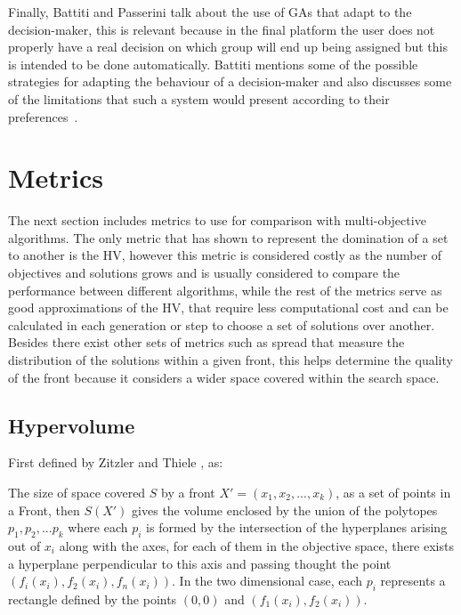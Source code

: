 Finally, Battiti and Passerini \cite{Battiti2010-xo} talk about the use of GAs that adapt to the decision-maker, this is relevant because in the final platform the user does not properly have a real decision on which group will end up being assigned but this is intended to be done automatically. Battiti mentions some of the possible strategies for adapting the behaviour of a decision-maker and also discusses some of the limitations that such a system would present according to their preferences~\cite{Wang2010-zh}.\\

\section{Metrics}

The next section includes metrics to use for comparison with multi-objective algorithms. The only metric that has shown to represent the domination of a set to another is the HV, however this metric is considered costly as the number of objectives and solutions grows and is usually considered to compare the performance between different algorithms, while the rest of the metrics serve as good approximations of the HV, that require less computational cost and can be calculated in each generation or step to choose a set of solutions over another. Besides there exist other sets of metrics such as spread that measure the distribution of the solutions within a given front, this helps determine the quality of the front because it considers a wider space covered within the search space.\\

\subsection{Hypervolume}

First defined by Zitzler and Thiele \cite{zitzler1999multiobjective}, as:

\begin{definition}
The size of space covered $S$ by a front $X' = (x_1, x_2,...,x_k)$, as a set of points in a Front, then $S(X')$ gives the volume enclosed by the union of the polytopes $p_1, p_2,... p_k$ where each $p_i$ is formed by the intersection of the hyperplanes arising out of ${x_i}$ along with the axes, for each of them in the objective space, there exists a hyperplane perpendicular to this axis and passing thought the point $(f_i(x_i), f_2(x_i), f_n(x_i))$. In the two dimensional case, each $p_i$ represents a rectangle defined by the points $(0,0)$ and $(f_1(x_i),f_2(x_i))$.
\end{definition}

